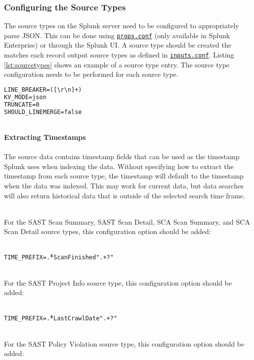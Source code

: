 \subsubsection{Configuring the Source Types}

The source types on the Splunk server need to be configured to appropriately parse JSON.  
This can be done using \href{https://docs.splunk.com/Documentation/Splunk/latest/Admin/Propsconf}{\texttt{props.conf}} (only available in Splunk Enterprise) 
or through the Splunk UI. A source type should be created the matches each record output source types as defined in 
\href{https://docs.splunk.com/Documentation/Splunk/latest/Admin/Inputsconf}{\texttt{inputs.conf}}.  Listing \ref{lst:sourcetypes} shows an example
of a source type entry.  The source type configuration needs to be performed for each source type.


\begin{lstlisting}[caption={Log4Net Record File Appenders}, label={lst:sourcetypes}, language=XML]
LINE_BREAKER=([\r\n]+)
KV_MODE=json
TRUNCATE=0
SHOULD_LINEMERGE=false
\end{lstlisting}

\noindent\\\textbf{Extracting Timestamps}\\

\noindent\\The source data contains timestamp fields that can be used as the timestamp Splunk uses when indexing the data.  Without specifying how to extract the
timestamp from each source type, the timestamp will default to the timestamp when the data was indexed.  This may work for current data, but data searches 
will also return historical data that is outside of the selected search time frame.

\noindent\\For the SAST Scan Summary, SAST Scan Detail, SCA Scan Summary, and SCA Scan Detail source types, this configuration option should be added:

\noindent\\\texttt{TIME\_PREFIX=\^.*ScanFinished".+?"}

\noindent\\For the SAST Project Info source type, this configuration option should be added:

\noindent\\\texttt{TIME\_PREFIX=\^.*LastCrawlDate".+?"}

\noindent\\For the SAST Policy Violation source type, this configuration option should be added:

